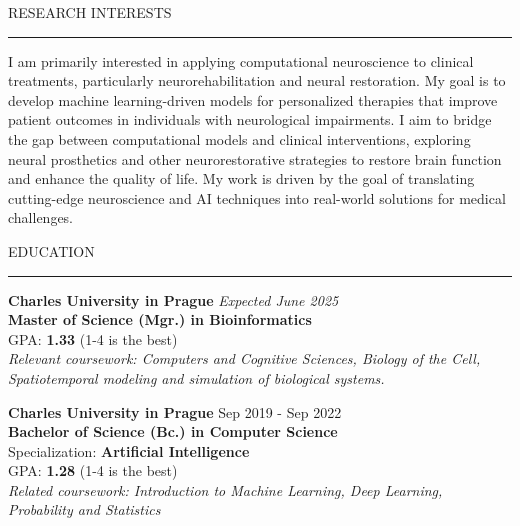 \documentclass{resume} %
\renewenvironment{rSection}[1]{
\sectionskip
\textcolor{CarnegieMellonRed}{\MakeUppercase{#1}}
\sectionlineskip
\hrule
\begin{list}{}{
\setlength{\leftmargin}{1.5em}
}
\item[]
}{
\end{list}
}
\begin{document}
\begin{rSection}{Research Interests}
    I am primarily interested in applying computational neuroscience to clinical treatments, 
    particularly neurorehabilitation and neural restoration. My goal is to develop machine 
    learning-driven models for personalized therapies that improve patient outcomes in 
    individuals with neurological impairments. I aim to bridge the gap between computational 
    models and clinical interventions, exploring neural prosthetics and other neurorestorative 
    strategies to restore brain function and enhance the quality of life.
    My work is driven by the goal of translating cutting-edge neuroscience and 
    AI techniques into real-world solutions for medical challenges.
\end{rSection}

\begin{rSection}{Education}
{\bf \large Charles University in Prague} \hfill {\em Expected June 2025} 
\\ {\bf Master of Science (Mgr.) in Bioinformatics} \hfill
\\ GPA: \textbf{1.33} (1-4 \vline {} is the best)  \hfill
\\ \textit{Relevant coursework: Computers and Cognitive Sciences, Biology of the Cell, 
Spatiotemporal modeling and simulation of biological systems.
}

{\bf \large Charles University in Prague} \hfill {Sep 2019 - Sep 2022} 
\\ {\bf Bachelor of Science (Bc.) in Computer Science} \hfill
\\ Specialization: \textbf{Artificial Intelligence} \hfill
\\ GPA: \textbf{1.28} (1-4 \vline {} is the best)  \hfill
\\ \textit{Related coursework: Introduction to Machine Learning, Deep Learning, 
Probability and Statistics
}

\end{rSection}
\end{document}
